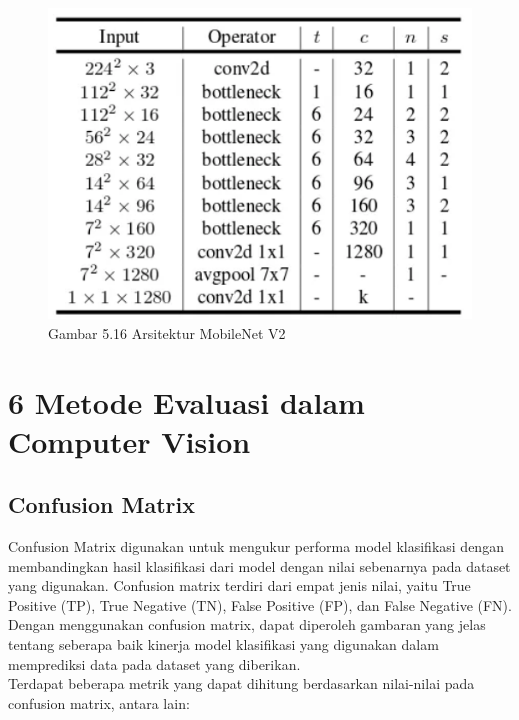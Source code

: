 \documentclass[
  letterpaper,
  DIV=11,
  numbers=noendperiod]{scrreprt}
\begin{document}
\begin{figure}

{\centering \includegraphics{Asset/mobilenetars.png}

}

\caption{Gambar 5.16 Arsitektur MobileNet V2}

\end{figure}

\hypertarget{metode-evaluasi-dalam-computer-vision}{%
\chapter*{6 Metode Evaluasi dalam Computer
Vision}\label{metode-evaluasi-dalam-computer-vision}}


\hypertarget{confusion-matrix}{%
\section*{Confusion Matrix}\label{confusion-matrix}}


Confusion Matrix digunakan untuk mengukur performa model klasifikasi
dengan membandingkan hasil klasifikasi dari model dengan nilai
sebenarnya pada dataset yang digunakan. Confusion matrix terdiri dari
empat jenis nilai, yaitu True Positive (TP), True Negative (TN), False
Positive (FP), dan False Negative (FN). Dengan menggunakan confusion
matrix, dapat diperoleh gambaran yang jelas tentang seberapa baik
kinerja model klasifikasi yang digunakan dalam memprediksi data pada
dataset yang diberikan.\\
Terdapat beberapa metrik yang dapat dihitung berdasarkan nilai-nilai
pada confusion matrix, antara lain:
\end{document}
